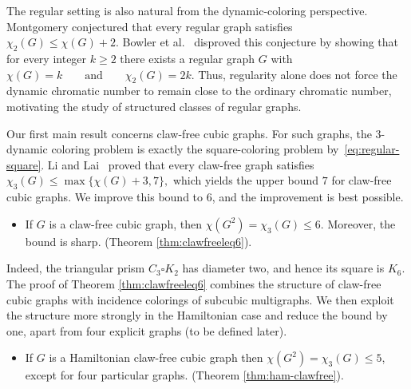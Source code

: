 The regular setting is also natural from the dynamic-coloring
perspective. Montgomery conjectured that every regular graph satisfies
$
\chi_2(G)\le\chi(G)+2.
$
Bowler et al.~\cite{BowlerEtAl2017} disproved this conjecture by showing
that for every integer $k\ge2$ there exists a regular graph $G$ with
$
\chi(G)=k
\qquad\text{and}\qquad
\chi_2(G)=2k.
$
Thus, regularity alone does not force the dynamic chromatic number to
remain close to the ordinary chromatic number, motivating the study of
structured classes of regular graphs.

Our first main result concerns claw-free cubic graphs. For such graphs,
the $3$-dynamic coloring problem is exactly the square-coloring problem
by~\eqref{eq:regular-square}. Li and Lai~\cite{LiLai2017} proved that
every claw-free graph satisfies
$
\chi_3(G)\le \max\{\chi(G)+3,7\},
$
which yields the upper bound $7$ for claw-free cubic graphs. We improve
this bound to $6$, and the improvement is best possible.

\begin{itemize}
    \item 
If $G$ is a claw-free cubic graph, then
$
\chi(G^2)=\chi_3(G)\le6.
$
Moreover, the bound is sharp. (Theorem \ref{thm:clawfreeleq6}).
\end{itemize}

Indeed, the triangular prism $C_3\square K_2$ has diameter two, and
hence its square is $K_6$.
The proof of Theorem \ref{thm:clawfreeleq6} combines the structure of claw-free cubic
graphs with incidence colorings of subcubic multigraphs. We then exploit
the structure more strongly in the Hamiltonian case and reduce the
bound by one, apart from four explicit graphs (to be defined later).


\begin{itemize}
    \item If $G$ is a Hamiltonian claw-free cubic graph then
$
\chi(G^2)=\chi_3(G)\le5$, except
for four particular graphs. (Theorem \ref{thm:ham-clawfree}).
\end{itemize}

